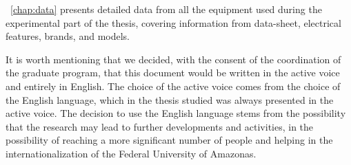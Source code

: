 ~\autoref{chap:data} presents detailed data from all the equipment used during the experimental part of the thesis, covering information from data-sheet, electrical features, brands, and models. 

It is worth mentioning that we decided, with the consent of the coordination of the graduate program, that this document would be written in the active voice and entirely in English. The choice of the active voice comes from the choice of the English language, which in the thesis studied was always presented in the active voice. The decision to use the English language stems from the possibility that the research may lead to further developments and activities, in the possibility of reaching a more significant number of people and helping in the internationalization of the Federal University of Amazonas.